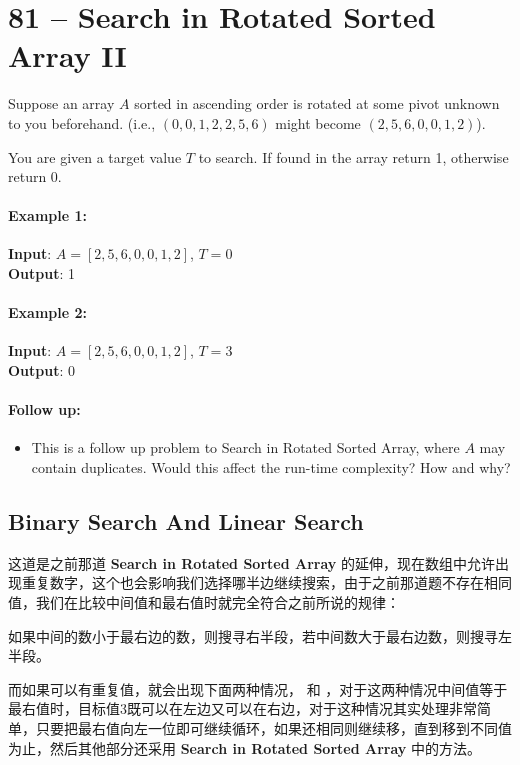 \section{81 -- Search in Rotated Sorted Array II}
Suppose an array $A$ sorted in ascending order is rotated at some pivot unknown to you beforehand. (i.e., $(0,0,1,2,2,5,6)$ might become $(2,5,6,0,0,1,2)$).
\par
You are given a target value $T$ to search. If found in the array return 1, otherwise return 0.
\paragraph{Example 1:}
\begin{flushleft}
\textbf{Input}: $A = [2,5,6,0,0,1,2]$, $T = 0$
\\
\textbf{Output}: 1
\end{flushleft}
\paragraph{Example 2:}
\begin{flushleft}
\textbf{Input}: $A = [2,5,6,0,0,1,2]$, $T = 3$
\\
\textbf{Output}: 0
\end{flushleft}
\paragraph{Follow up:}
\begin{itemize}
    \item This is a follow up problem to Search in Rotated Sorted Array, where $A$ may contain duplicates. Would this affect the run-time complexity? How and why?
\end{itemize}
\subsection{Binary Search And Linear Search}
这道是之前那道 \textbf{Search in Rotated Sorted Array} 的延伸，现在数组中允许出现重复数字，这个也会影响我们选择哪半边继续搜索，由于之前那道题不存在相同值，我们在比较中间值和最右值时就完全符合之前所说的规律：

如果中间的数小于最右边的数，则搜寻右半段，若中间数大于最右边数，则搜寻左半段。

而如果可以有重复值，就会出现下面两种情况，\fcj{[3 1 1]} 和 \fcj{[1 1 3 1]}，对于这两种情况中间值等于最右值时，目标值3既可以在左边又可以在右边，对于这种情况其实处理非常简单，只要把最右值向左一位即可继续循环，如果还相同则继续移，直到移到不同值为止，然后其他部分还采用 \textbf{Search in Rotated Sorted Array} 中的方法。


